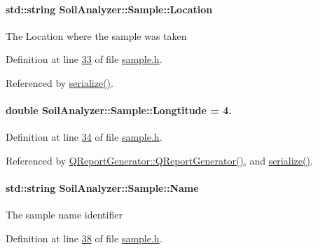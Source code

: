\paragraph[{Location}]{\setlength{\rightskip}{0pt plus 5cm}std\+::string Soil\+Analyzer\+::\+Sample\+::\+Location}\label{class_soil_analyzer_1_1_sample_afa863082d9931f8b5a7ab2429446c132}
The Location where the sample was taken 

Definition at line \hyperlink{sample_8h_source_l00033}{33} of file \hyperlink{sample_8h_source}{sample.\+h}.



Referenced by \hyperlink{sample_8h_source_l00085}{serialize()}.

\hypertarget{class_soil_analyzer_1_1_sample_a7fc9f7ac8ea1f8fa87450bea41c33683}{}
\paragraph[{Longtitude}]{\setlength{\rightskip}{0pt plus 5cm}double Soil\+Analyzer\+::\+Sample\+::\+Longtitude = 4.}\label{class_soil_analyzer_1_1_sample_a7fc9f7ac8ea1f8fa87450bea41c33683}


Definition at line \hyperlink{sample_8h_source_l00034}{34} of file \hyperlink{sample_8h_source}{sample.\+h}.



Referenced by \hyperlink{qreportgenerator_8cpp_source_l00004}{Q\+Report\+Generator\+::\+Q\+Report\+Generator()}, and \hyperlink{sample_8h_source_l00085}{serialize()}.

\hypertarget{class_soil_analyzer_1_1_sample_a94a2895e7885f5195ef7d050f37ee233}{}
\paragraph[{Name}]{\setlength{\rightskip}{0pt plus 5cm}std\+::string Soil\+Analyzer\+::\+Sample\+::\+Name}\label{class_soil_analyzer_1_1_sample_a94a2895e7885f5195ef7d050f37ee233}
The sample name identifier 

Definition at line \hyperlink{sample_8h_source_l00038}{38} of file \hyperlink{sample_8h_source}{sample.\+h}.



